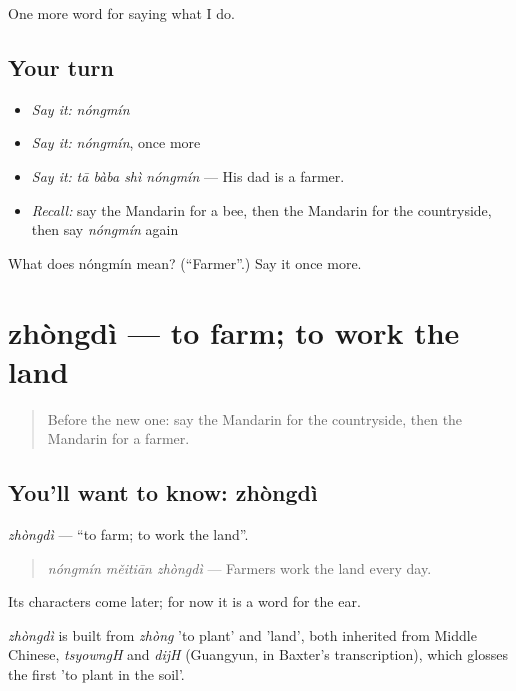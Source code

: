 \begin{grammarlens}[title={What you've built}]
One more word for saying what I do.
\end{grammarlens}

\subsection*{Your turn}
\begin{itemize}
\raggedright
  \item \emph{Say it:} \emph{nóngmín}
  \item \emph{Say it:} \emph{nóngmín}, once more
  \item \emph{Say it:} \emph{tā bàba shì nóngmín} — His dad is a farmer.
  \item \emph{Recall:} say the Mandarin for a bee, then the Mandarin for the countryside, then say \emph{nóngmín} again
\end{itemize}

\begin{tcolorbox}[breakable,colback=teal!4,colframe=teal!35!black,title={Before you move on}]
What does nóngmín mean? (\textquotedblleft{}Farmer\textquotedblright{}.) Say it once more.
\end{tcolorbox}
\section[zhòngdì]{zhòngdì — to farm; to work the land}

\label{lesson:ZH-C225-zhongdi}



\begin{quote}
Before the new one: say the Mandarin for the countryside, then the Mandarin for a farmer.
\end{quote}

\subsection*{You'll want to know: zhòngdì}
\emph{zhòngdì} — \textquotedblleft{}to farm; to work the land\textquotedblright{}.

\begin{quote}
\emph{nóngmín měitiān zhòngdì} — Farmers work the land every day.
\end{quote}

Its characters come later; for now it is a word for the ear.

\begin{cousinweb}
\emph{zhòngdì} is built from \emph{zhòng} 'to plant' and  'land', both inherited from Middle Chinese, \emph{tsyowngH} and \emph{dijH} (Guangyun, in Baxter's transcription), which glosses the first 'to plant in the soil'.
\end{cousinweb}

